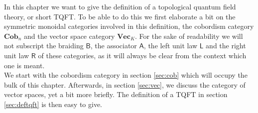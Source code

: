 In this chapter we want to give the definition of a topological quantum field theory, or short TQFT. To be able to do this we first elaborate a bit on the symmetric monoidal categories involved in this definition, the cobordism category $\mathbf{Cob}_{n}$ and the vector space category $\mathbf{Vec}_{K}$. For the sake of readability we will not subscript the braiding $\mathsf{B}$, the associator $\mathsf{A}$, the left unit law $\mathsf{L}$ and the right unit law $\mathsf{R}$ of these categories, as it will always be clear from the context which one is meant.
\\
We start with the cobordism category in section \ref{sec:cob} which will occupy the bulk of this chapter. Afterwards, in section \ref{sec:vec}, we discuss the category of vector spaces, yet a bit more briefly. The definition of a TQFT in section \ref{sec:deftqft} is then easy to give.
